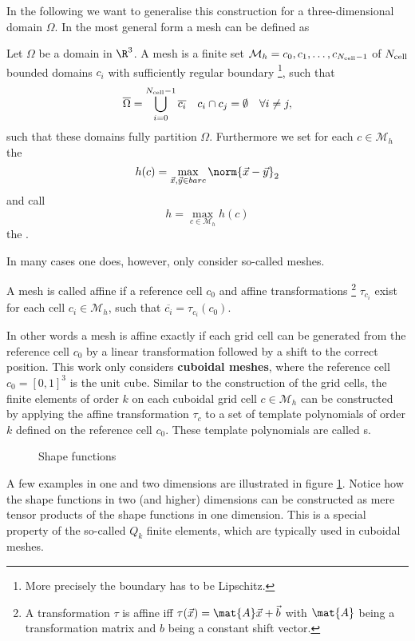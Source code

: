In the following we want to generalise this construction
for a three-dimensional domain $\Omega$.
In the most general form a mesh can be defined as
\begin{defn}[Mesh]
	Let $\Omega$ be a domain in $\R^3$.
	A mesh is a finite set $\mathcal{M}_h = {c_0, c_1, \ldots, c_{N_\text{cell}-1}}$
	of $N_\text{cell}$ bounded domains $c_i$ with sufficiently regular boundary%
	\footnote{More precisely the boundary has to be Lipschitz.},
	such that
	\begin{align*}
		\overline{\Omega} &= \bigcup_{i=0}^{N_\text{cell}-1} \overline{c_i}
		&c_i \cap c_j = \emptyset \quad \forall i \neq j,
	\end{align*}
	\ie such that these domains fully partition $\Omega$.
	Furthermore we set for each $c \in \mathcal{M}_h$
	the 
	\[ h(c) = \max_{\vec{x},\vec{y} \in bar{c}} \norm{\vec{x}-\vec{y}}_2 \]
	and call
	\[ h = \max_{c \in \mathcal{M}_h} h(c) \]
	the .
\end{defn}
In many cases one does, however, only consider
so-called  meshes.
\begin{defn}
	A mesh is called affine if a reference cell $c_0$
	and affine transformations%
	\footnote{A transformation $\tau$ is affine iff $\tau(\vec{x}) = \mat{A}\vec{x} + \vec{b}$ with $\mat{A}$ being a transformation matrix and $b$ being a constant shift vector.}
	$\tau_{c_i}$ exist for each cell $c_i \in \mathcal{M}_h$,
	such that $\overline{c_i} = \tau_{c_i}(c_0)$.
\end{defn}
In other words a mesh is affine exactly if each
grid cell can be generated from the reference cell $c_0$
by a linear transformation followed by a shift to the correct position.
This work only considers \textbf{cuboidal meshes},
where the reference cell $c_0 = [0,1]^3$ is the unit cube.
Similar to the construction of the grid cells,
the finite elements of order $k$
on each cuboidal grid cell $c \in \mathcal{M}_h$
can be constructed by applying the affine transformation $\tau_c$
to a set of template polynomials of order $k$
defined on the reference cell $c_0$.
These template polynomials are called
s.
%
\begin{figure}
	\centering
	\caption{Shape functions}
	\label{fig:ShapeFunctions}
\end{figure}
%
A few examples in one and two dimensions are illustrated
in figure \ref{fig:ShapeFunctions}.
Notice how the shape functions in two (and higher) dimensions
can be constructed as mere tensor products
of the shape functions in one dimension.
This is a special property of the so-called $Q_k$ finite elements,
which are typically used in cuboidal meshes.

